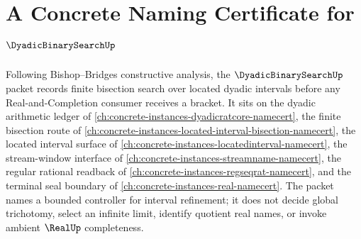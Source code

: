 \chapter{A Concrete Naming Certificate for $\DyadicBinarySearchUp$}
\label{ch:concrete-instances-dyadic-binary-search-namecert}

Following Bishop--Bridges constructive analysis, the $\DyadicBinarySearchUp$ packet records finite bisection search over located dyadic intervals before any Real-and-Completion consumer receives a bracket. It sits on the dyadic arithmetic ledger of \autoref{ch:concrete-instances-dyadicratcore-namecert}, the finite bisection route of \autoref{ch:concrete-instances-located-interval-bisection-namecert}, the located interval surface of \autoref{ch:concrete-instances-locatedinterval-namecert}, the stream-window interface of \autoref{ch:concrete-instances-streamname-namecert}, the regular rational readback of \autoref{ch:concrete-instances-regseqrat-namecert}, and the terminal seal boundary of \autoref{ch:concrete-instances-real-namecert}. The packet names a bounded controller for interval refinement; it does not decide global trichotomy, select an infinite limit, identify quotient real names, or invoke ambient $\RealUp$ completeness.

